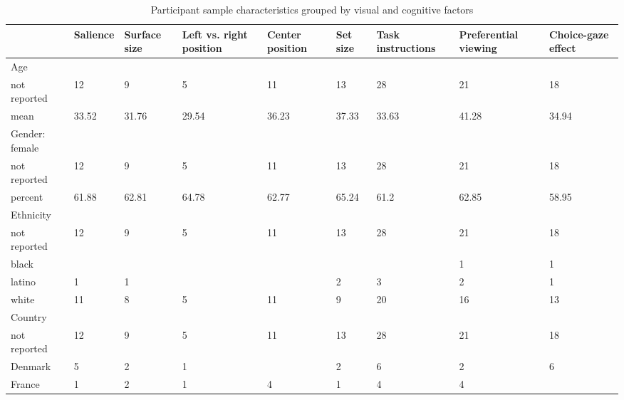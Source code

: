 \begin{table}[ht]
\centering
\caption{Participant sample characteristics grouped by visual and cognitive factors} 
\label{tab:sampleTable}
\begingroup\small
\begin{tabular}{lp{.07\linewidth}p{.07\linewidth}p{.09\linewidth}p{.09\linewidth}p{.07\linewidth}p{.08\linewidth}p{.1\linewidth}p{.07\linewidth}}
  \hline
  & Salience & Surface size & Left vs. right position & Center position & Set size & Task instructions & Preferential viewing & Choice-gaze effect \\ 
  \hline
Age &  &  &  &  &  &  &  &  \\ 
  \hspace{2mm}not reported & 12 & 9 & 5 & 11 & 13 & 28 & 21 & 18 \\ 
  \hspace{2mm}mean & 33.52 & 31.76 & 29.54 & 36.23 & 37.33 & 33.63 & 41.28 & 34.94 \\ 
  Gender: female &  &  &  &  &  &  &  &  \\ 
  \hspace{2mm}not reported & 12 & 9 & 5 & 11 & 13 & 28 & 21 & 18 \\ 
  \hspace{2mm}percent & 61.88 & 62.81 & 64.78 & 62.77 & 65.24 & 61.2 & 62.85 & 58.95 \\ 
  Ethnicity &  &  &  &  &  &  &  &  \\ 
  \hspace{2mm}not reported & 12 & 9 & 5 & 11 & 13 & 28 & 21 & 18 \\ 
  \hspace{2mm}black &  &  &  &  &  &  & 1 & 1 \\ 
  \hspace{2mm}latino & 1 & 1 &  &  & 2 & 3 & 2 & 1 \\ 
  \hspace{2mm}white & 11 & 8 & 5 & 11 & 9 & 20 & 16 & 13 \\ 
  Country &  &  &  &  &  &  &  &  \\ 
  \hspace{2mm}not reported & 12 & 9 & 5 & 11 & 13 & 28 & 21 & 18 \\ 
  \hspace{2mm}Denmark & 5 & 2 & 1 &  & 2 & 6 & 2 & 6 \\ 
  \hspace{2mm}France & 1 & 2 & 1 & 4 & 1 & 4 & 4 &  \\ 

\end{tabular}
\end{table}
